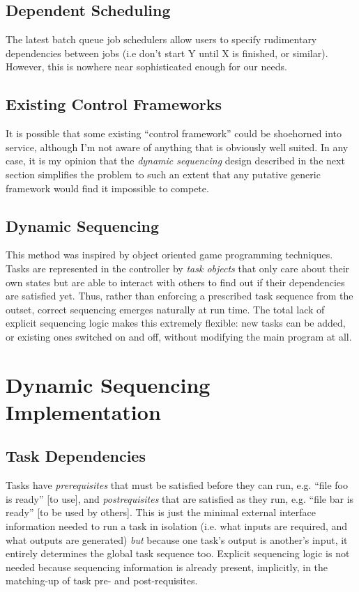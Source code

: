 \documentclass[a4paper,12pt]{amsart}
\begin{document}
\subsection{Dependent Scheduling}

The latest batch queue job schedulers allow users to specify rudimentary
dependencies between jobs (i.e don't start Y until X is finished, or
similar). However, this is nowhere near sophisticated enough for our
needs. 


\subsection{Existing Control Frameworks}

It is possible that some existing ``control framework'' could be
shoehorned into service, although I'm not aware of anything that is
obviously well suited. In any case, it is my opinion that the {\em
dynamic sequencing} design described in the next section simplifies the
problem to such an extent that any putative generic framework would find
it impossible to compete. 


\subsection{Dynamic Sequencing}

This method was inspired by object oriented game programming techniques.
Tasks are represented in the controller by {\em task objects} that only
care about their own states but are able to interact with others to find
out if their dependencies are satisfied yet. Thus, rather than enforcing
a prescribed task sequence from the outset, correct sequencing emerges
naturally at run time.  The total lack of explicit sequencing logic
makes this extremely flexible: new tasks can be added, or existing ones
switched on and off, without modifying the main program at all.


\section{Dynamic Sequencing Implementation}

\subsection{Task Dependencies}

Tasks have {\em prerequisites} that must be satisfied before they can
run, e.g. ``file foo is ready'' [to use], and {\em postrequisites} that
are satisfied as they run, e.g. ``file bar is ready'' [to be used by
others]. This is just the minimal external interface information needed
to run a task in isolation (i.e. what inputs are required, and what
outputs are generated) {\em but} because one task's output is another's
input, it entirely determines the global task sequence too. Explicit
sequencing logic is not needed because sequencing information is already
present, implicitly, in the matching-up of task pre- and
post-requisites. 
\end{document}
